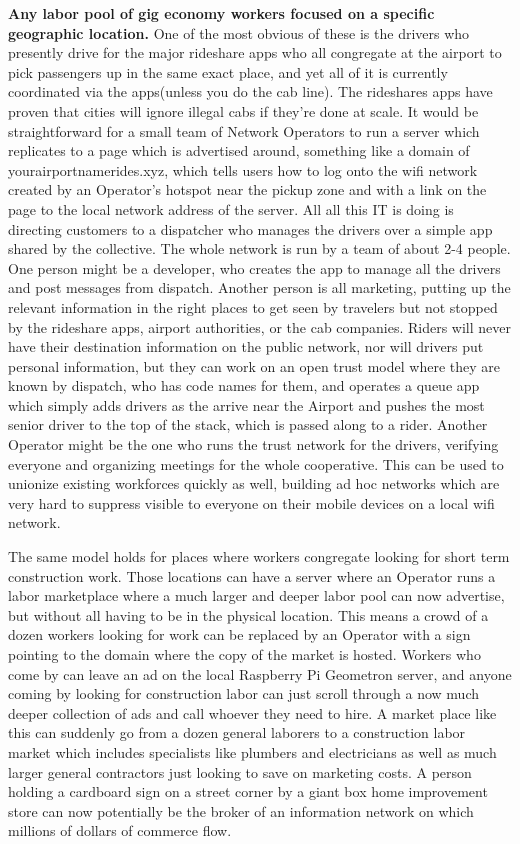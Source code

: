 \textbf{Any labor pool of gig economy workers focused on a specific geographic location.}  One of the most obvious of these is the drivers who presently drive for the major rideshare apps who all congregate at the airport to pick passengers up in the same exact place, and yet all of it is currently coordinated via the apps(unless you do the cab line).  The rideshares apps have proven that cities will ignore illegal cabs if they're done at scale.  It would be straightforward for a small team of Network Operators to run a server which replicates to a page which is advertised around, something like a domain of yourairportnamerides.xyz, which tells users how to log onto the wifi network created by an Operator's hotspot near the pickup zone and with a link on the page to the local network address of the server.  All all this IT is doing is directing customers to a dispatcher who manages the drivers over a simple app shared by the collective.  The whole network is run by a team of about 2-4 people.  One person might be a developer, who creates the app to manage all the drivers and post messages from dispatch.  Another person is all marketing, putting up the relevant information in the right places to get seen by travelers but not stopped by the rideshare apps, airport authorities, or the cab companies.  Riders will never have their destination information on the public network, nor will drivers put personal information, but they can work on an open trust model where they are known by dispatch, who has code names for them, and operates a queue app which simply adds drivers as the arrive near the Airport and pushes the most senior driver to the top of the stack, which is passed along to a rider.  Another Operator might be the one who runs the trust network for the drivers, verifying everyone and organizing meetings for the whole cooperative.  This can be used to unionize existing workforces quickly as well, building ad hoc networks which are very hard to suppress visible to everyone on their mobile devices on a local wifi network.  

The same model holds for places where workers congregate looking for short term construction work.  Those locations can have a server where an Operator runs a labor marketplace where a much larger and deeper labor pool can now advertise, but without all having to be in the physical location.  This means a crowd of a dozen workers looking for work can be replaced by an Operator with a sign pointing to the domain where the copy of the market is hosted.  Workers who come by can leave an ad on the local Raspberry Pi Geometron server, and anyone coming by looking for construction labor can just scroll through a now much deeper collection of ads and call whoever they need to hire.  A market place like this can suddenly go from a dozen general laborers to a construction labor market which includes specialists like plumbers and electricians as well as much larger general contractors just looking to save on marketing costs.  A person holding a cardboard sign on a street corner by a giant box home improvement store can now potentially be the broker of an information network on which millions of dollars of commerce flow.  


